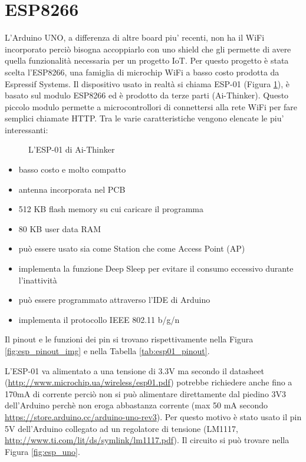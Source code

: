 \documentclass[12pt]{report}
\begin{document}
%
\section{ESP8266}\label{sec:esp8266}
%

L'Arduino UNO, a differenza di altre board piu' recenti, non ha il WiFi incorporato perciò bisogna accoppiarlo con uno shield che gli permette di avere quella funzionalità necessaria per un progetto IoT. Per questo progetto è stata scelta l'ESP8266, una famiglia di microchip WiFi a basso costo prodotta da Espressif Systems. Il dispositivo usato in realtà si chiama ESP-01 (Figura \ref{fig:esp01}), è basato sul modulo ESP8266 ed è prodotto da terze parti (Ai-Thinker). Questo piccolo modulo permette a microcontrollori di connettersi alla rete WiFi per fare semplici chiamate HTTP.
Tra le varie caratteristiche vengono elencate le piu' interessanti:

\begin{figure}
	\caption{L'ESP-01 di Ai-Thinker}
	\label{fig:esp01}
\end{figure}


\begin{itemize}
	\item basso costo e molto compatto
	\item antenna incorporata nel PCB
	\item 512 KB flash memory su cui caricare il programma
	\item 80 KB user data RAM
	\item può essere usato sia come Station che come Access Point (AP)
	\item implementa la funzione Deep Sleep per evitare il consumo eccessivo durante l'inattività
	\item può essere programmato attraverso l'IDE di Arduino
	\item implementa il protocollo IEEE 802.11 b/g/n
\end{itemize}
Il pinout e le funzioni dei pin si trovano rispettivamente nella Figura \ref{fig:esp_pinout_img} e nella Tabella \ref{tab:esp01_pinout}. 

L'ESP-01 va alimentato a una tensione di 3.3V ma secondo il datasheet (\url{http://www.microchip.ua/wireless/esp01.pdf}) potrebbe richiedere anche fino a 170mA di corrente perciò non si può alimentare direttamente dal piedino 3V3 dell'Arduino perchè non eroga abbastanza corrente (max 50 mA secondo \url{https://store.arduino.cc/arduino-uno-rev3}). Per questo motivo è stato usato il pin 5V dell'Arduino collegato ad un regolatore di tensione (LM1117, \url{http://www.ti.com/lit/ds/symlink/lm1117.pdf}). 
Il circuito si può trovare nella Figura \ref{fig:esp_uno}.
\end{document}
